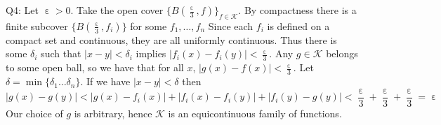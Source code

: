 \documentclass[letterpaper]{article}
\DeclareMathOperator{\ep}{\varepsilon}
\begin{document}
\noindent Q4: Let $\ep>0$. Take the open cover $\{B(\frac{\ep}{3}, f)\}_{f\in \mathcal{K}}$. By compactness there is a finite subcover $\{B(\frac{\ep}{3}, f_i)\}$ for some $f_1, \dots, f_n$
Since each $f_i$ is defined on a compact set and continuous, they are all uniformly continuous. Thus there is some $\delta_i$ such that $|x-y|< \delta_i$ implies $|f_i(x) -f_i(y)|< \frac{\ep}{3}.$ Any $g\in \mathcal{K}$ belongs to some open ball, so we have that for all $x$, 
$|g(x)-f(x)|< \frac{\ep}{3}. $ Let $\delta = \min\{\delta_1 \dots \delta_n\}$. If we have $|x-y|< \delta$ then $$|g(x)-g(y)| < |g(x)-f_i(x)| + |f_i(x) - f_i(y)| +|f_i(y) - g(y)|  < \frac{\ep}{3} + \frac{\ep}{3} + \frac{\ep}{3} = \ep$$
Our choice of $g$ is arbitrary, hence $\mathcal{K}$ is an equicontinuous family of functions. 
\end{document}
